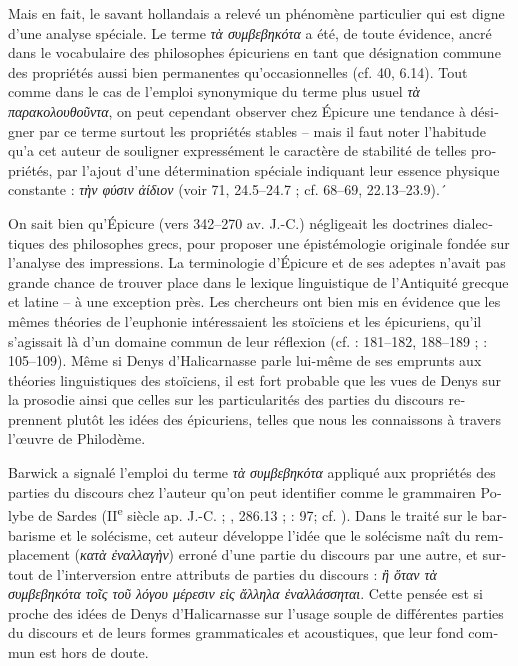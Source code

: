 \documentclass[output=paper]{langsci/langscibook}
\begin{document}
\begin{otherlanguage}{french}
Mais en fait, le savant hollandais a relevé un phénomène particulier qui est digne d’une analyse spéciale. Le terme \textit{τὰ συμβεβηκότα} a été, de toute évidence, ancré dans le vocabulaire des philosophes épicuriens en tant que désignation commune des propriétés aussi bien permanentes qu’occasionnelles (cf.  40, 6.14). Tout comme dans le cas de l’emploi synonymique du terme plus usuel \textit{τὰ παρακολουθοῦντα}, on peut cependant observer chez Épicure une tendance à désigner par ce terme surtout les propriétés stables – mais il faut noter l’habitude qu’a cet auteur de souligner expressément le caractère de stabilité de telles propriétés, par l’ajout d’une détermination spéciale indiquant leur essence physique constante : \textit{τὴν φύσιν ἀίδιον} (voir  71, 24.5--24.7 ; cf. 68--69, 22.13–23.9).´

On sait bien qu’Épicure (vers 342–270 av. J.-C.) négligeait les doctrines dialectiques des philosophes grecs, pour proposer une épistémologie originale fondée sur l’analyse des impressions. La terminologie d’Épicure et de ses adeptes n’avait pas grande chance de trouver place dans le lexique linguistique de l’Antiquité grecque et latine – à une exception près. Les chercheurs ont bien mis en évidence que les mêmes théories de l’euphonie intéressaient les stoïciens et les épicuriens, qu’il s’agissait là d’un domaine commun de leur réflexion (cf. \citealt{janko_philodemus._2000}: 181–182, 188–189 ; \citealt{campbell_philodenus_2002}: 105–109). Même si Denys d’Halicarnasse parle lui-même de ses emprunts aux théories linguistiques des stoïciens, il est fort probable que les vues de Denys sur la prosodie ainsi que celles sur les particularités des parties du discours reprennent plutôt les idées des épicuriens, telles que nous les connaissons à travers l’œuvre de Philodème.

Barwick a signalé l’emploi du terme \textit{τὰ συμβεβηκότα} appliqué aux propriétés des parties du discours chez l’auteur qu’on peut identifier comme le grammairen Polybe de Sardes (II\textsuperscript{e} siècle ap. J.-C. ; , 286.13 ; \citealt{barwick_remmius_1922}: 97; cf. \citealt{jones_polybius_1996}). Dans le traité sur le barbarisme et le solécisme, cet auteur développe l’idée que le solécisme naît du remplacement (\textit{κατὰ ἐναλλαγὴν}) erroné d’une partie du discours par une autre, et surtout de l’interversion entre attributs de parties du discours : \textit{ἢ ὅταν τὰ συμβεβηκότα τοῖς τοῦ λόγου μέρεσιν εἰς ἄλληλα ἐναλλάσσηται}. Cette pensée est si proche des idées de Denys d’Halicarnasse sur l’usage souple de différentes parties du discours et de leurs formes grammaticales et acoustiques, que leur fond commun est hors de doute. 


\end{otherlanguage}
\end{document}

